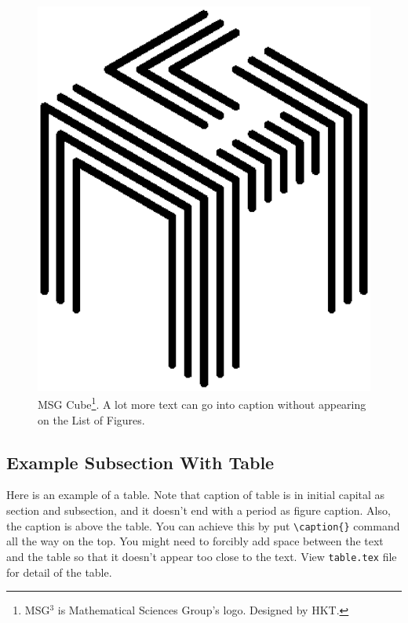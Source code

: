 \begin{figure}[htbp]
\centering
\includegraphics[width=4.5in]{msgcube.eps}
\caption[Caption appearing in List of Figure.]{MSG Cube\protect\footnote{MSG$^3$ is Mathematical Sciences Group's logo. Designed by HKT.}. A lot more text can go into caption without appearing on the List of Figures.}
\label{fig:1} 
\end{figure}

\newpage
\subsection{Example Subsection With Table}

Here is an example of a table. Note that caption of table is in initial capital as section and subsection, and it doesn't end with a period as figure caption. Also, the caption is above the table.  You can achieve this by put \verb#\caption{}# command all the way on the top.  You might need to forcibly add space between the text and the table so that it doesn't appear too close to the text.  View \verb#table.tex# file for detail of the table.
\vspace{4mm}


